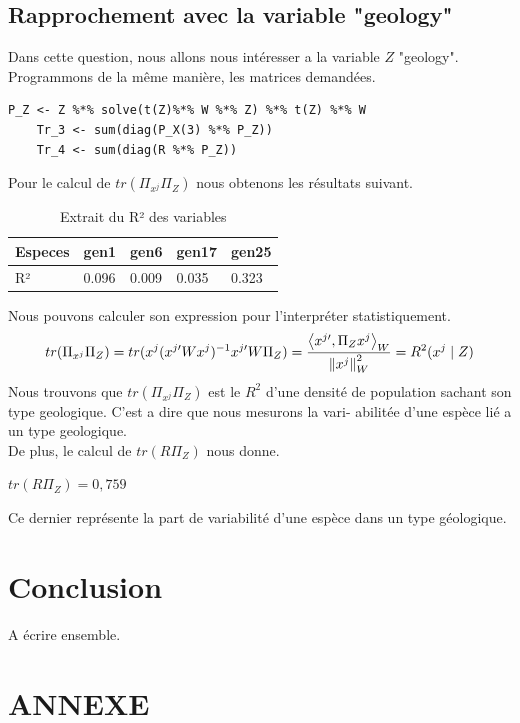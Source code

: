 \documentclass{article}
\begin{document}
\subsection{Rapprochement avec la variable "geology"}
Dans cette question, nous allons nous intéresser a la variable $Z$ "geology". Programmons de la même manière, les matrices demandées.
\begin{lstlisting}[caption=Extrait du code R, label= Question 1c]
    P_Z <- Z %*% solve(t(Z)%*% W %*% Z) %*% t(Z) %*% W
    Tr_3 <- sum(diag(P_X(3) %*% P_Z))
    Tr_4 <- sum(diag(R %*% P_Z))
\end{lstlisting}
Pour le calcul de $tr(\Pi_{x^j}\Pi_Z)$ nous obtenons les résultats suivant. 
\begin{table}[H]
    \centering
    \begin{tabular}{|l|l|l|l|l|}
    \hline
    Especes & gen1  & gen6  & gen17 & gen25 \\ \hline
    R²      & 0.096 & 0.009 & 0.035 & 0.323 \\ \hline
    \end{tabular}
    \centering
    \caption{Extrait du R² des variables}
\end{table}
Nous pouvons calculer son expression pour l'interpréter statistiquement.
\[
 tr(\Pi_{x^{j}}\Pi_Z) = tr(x^{j}(x^{j\prime}Wx^{j})^{-1}x^{j\prime}W\Pi_Z) = \frac{\left\langle x^{j\prime},\Pi_Zx^{j}\right\rangle_W }{\left\lVert x^j\right\rVert^2_W }\\= R^2(x^j\mid Z )
\]
Nous trouvons que $tr(\Pi_{x^{j}}\Pi_Z)$ est le $R^2$ d’une densité de
population sachant son type geologique. C’est a dire que nous mesurons la vari-
abilitée d’une espèce lié a un type geologique.\\
De plus, le calcul de $tr(R\Pi_Z)$ nous donne.
\begin{center}
    $tr(R\Pi_Z)=0,759$
\end{center}
Ce dernier représente la part de variabilité d'une espèce dans un type géologique. 

\section{Conclusion}
A écrire ensemble.

\newpage
\section{ANNEXE}

 
\end{document}
